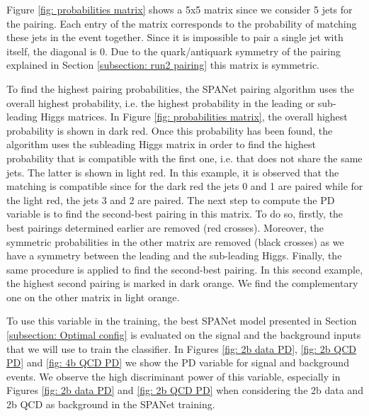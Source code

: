 Figure \ref{fig: probabilities matrix} shows a 5x5 matrix since we consider 5 jets for the pairing. Each entry of the matrix corresponds to the probability of matching these jets in the event together. Since it is impossible to pair a single jet with itself, the diagonal is 0. Due to the quark/antiquark symmetry of the pairing explained in Section \ref{subsection: run2 pairing} this matrix is symmetric.

To find the highest pairing probabilities, the SPANet pairing algorithm uses the overall highest probability, i.e. the highest probability in the leading or sub-leading Higgs matrices. In Figure \ref{fig: probabilities matrix}, the overall highest probability is shown in dark red. Once this probability has been found, the algorithm uses the subleading Higgs matrix in order to find the highest probability that is compatible with the first one, i.e. that does not share the same jets. The latter is shown in light red. In this example, it is observed that the matching is compatible since for the dark red the jets 0 and 1 are paired while for the light red, the jets 3 and 2 are paired. The next step to compute the PD variable is to find the second-best pairing in this matrix. To do so, firstly, the best pairings determined earlier are removed (red crosses). Moreover, the symmetric probabilities in the other matrix are removed (black crosses) as we have a symmetry between the leading and the sub-leading Higgs. Finally, the same procedure is applied to find the second-best pairing. In this second example, the highest second pairing is marked in dark orange. We find the complementary one on the other matrix in light orange.

To use this variable in the training, the best SPANet model presented in Section \ref{subsection: Optimal config} is evaluated on the signal and the background inputs that we will use to train the classifier. 
In Figures \ref{fig: 2b data PD}, \ref{fig: 2b QCD PD} and \ref{fig: 4b QCD PD} we show the PD variable for signal and background events. We observe the high discriminant power of this variable, especially in Figures \ref{fig: 2b data PD} and \ref{fig: 2b QCD PD} when considering the 2b data and 2b QCD as background in the SPANet training.

